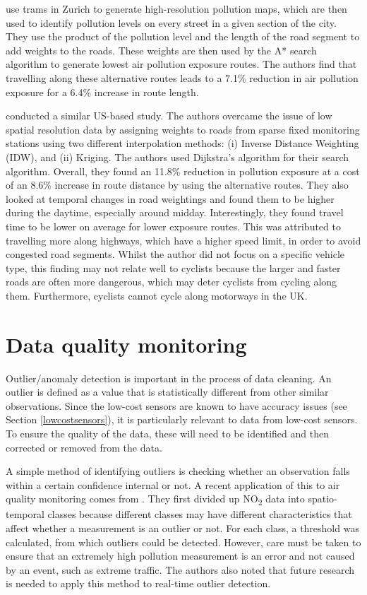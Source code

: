 \documentclass[11pt,twosided,a4paper]{report}
\begin{document}
\cite{Hasenfratz2015highresmapsTram} use trams in Zurich to generate high-resolution pollution maps, which are then used to identify pollution levels on every street in a given section of the city. They use the product of the pollution level and the length of the road segment to add weights to the roads. These weights are then used by the A* search algorithm to generate lowest air pollution exposure routes. The authors find that travelling along these alternative routes leads to a 7.1\% reduction in air pollution exposure for a 6.4\% increase in route length.

\cite{sharker2014exposureroutes} conducted a similar US-based study. The authors overcame the issue of low spatial resolution data by assigning weights to roads from sparse fixed monitoring stations using two different interpolation methods: (i) Inverse Distance Weighting (IDW), and (ii) Kriging. The authors used Dijkstra's algorithm for their search algorithm. Overall, they found an 11.8\% reduction in pollution exposure at a cost of an 8.6\% increase in route distance by using the alternative routes. They also looked at temporal changes in road weightings and found them to be higher during the daytime, especially around midday. Interestingly, they found travel time to be lower on average for lower exposure routes. This was attributed to travelling more along highways, which have a higher speed limit, in order to avoid congested road segments. Whilst the author did not focus on a specific vehicle type, this finding may not relate well to cyclists because the larger and faster roads are often more dangerous, which may deter cyclists from cycling along them. Furthermore, cyclists cannot cycle along motorways in the UK. 

\section{Data quality monitoring}

Outlier/anomaly detection is important in the process of data cleaning. An outlier is defined as a value that is statistically different from other similar observations. Since the low-cost sensors are known to have accuracy issues (see Section \ref{lowcostsensors}), it is particularly relevant to data from low-cost sensors. To ensure the quality of the data, these will need to be identified and then corrected or removed from the data.

A simple method of identifying outliers is checking whether an observation falls within a certain confidence internal or not. A recent application of this to air quality monitoring comes from \cite{vanZoest2018outlierdetection}. They first divided up NO\textsubscript{2} data into spatio-temporal classes because different classes may have different characteristics that affect whether a measurement is an outlier or not. For each class, a threshold was calculated, from which outliers could be detected.  However, care must be taken to ensure that an extremely high pollution measurement is an error and not caused by an event, such as extreme traffic. The authors also noted that future research is needed to apply this method to real-time outlier detection.
\end{document}
